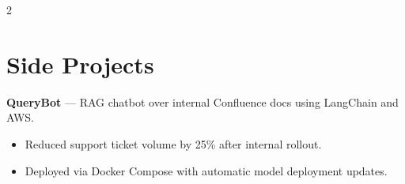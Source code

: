 \documentclass[10pt, letterpaper]{article}
\begin{document}
\begin{paracol}{2}
\section*{Side Projects}
\textbf{QueryBot} — RAG chatbot over internal Confluence docs using LangChain and AWS.
\begin{itemize}[leftmargin=*]
    \item Reduced support ticket volume by 25\% after internal rollout.
    \item Deployed via Docker Compose with automatic model deployment updates.
\end{itemize}

\end{paracol}
\end{document}
